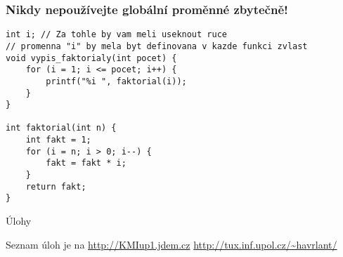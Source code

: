 \documentclass{beamer}
\begin{document}
\begin{frame}[t,fragile]\frametitle{Nikdy nepoužívejte globální proměnné zbytečně!} 
\begin{verbatim} 
int i; // Za tohle by vam meli useknout ruce
// promenna "i" by mela byt definovana v kazde funkci zvlast
void vypis_faktorialy(int pocet) {
    for (i = 1; i <= pocet; i++) {
        printf("%i ", faktorial(i));
    }
}

int faktorial(int n) {
    int fakt = 1;
    for (i = n; i > 0; i--) {
        fakt = fakt * i;
    }
    return fakt;
}
\end{verbatim}
\end{frame}


\begin{frame}[t,fragile]{Úlohy}
\begin{center}
\vskip 1cm
{\Large Seznam úloh je na \url{http://KMIup1.jdem.cz}}
\vskip 2cm
\url{http://tux.inf.upol.cz/~havrlant/}
\end{center}
\end{frame}
\end{document}

